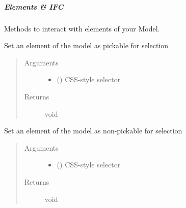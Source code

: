 \documentclass[a4paper,12pt,english]{sphinxmanual}
\begin{document}
\subparagraph{Elements \& IFC}
\label{\detokenize{viewer/parameters:elements-ifc}}
Methods to interact with elements of your Model.


\begin{fulllineitems}
\label{\detokenize{viewer/parameters:BIMDataViewer.setPickable}}
Set an element of the model as pickable for selection
\begin{quote}\begin{description}
\item[{Arguments}] \leavevmode\begin{itemize}
\item {} 
 () \textendash{} CSS-style selector

\end{itemize}

\item[{Returns}] \leavevmode
void

\end{description}\end{quote}

\end{fulllineitems}



\begin{fulllineitems}
\label{\detokenize{viewer/parameters:BIMDataViewer.setUnpickable}}
Set an element of the model as non-pickable for selection
\begin{quote}\begin{description}
\item[{Arguments}] \leavevmode\begin{itemize}
\item {} 
 () \textendash{} CSS-style selector

\end{itemize}

\item[{Returns}] \leavevmode
void

\end{description}\end{quote}

\end{fulllineitems}
\end{document}
